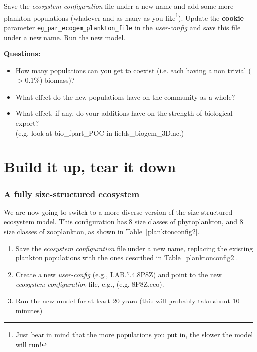 Save the \textit{ecosystem configuration} file under a new name and add some more plankton populations (whatever and as many as you like\footnote{Just bear in mind that the more populations you put in, the slower the model will run!}). Update the \textbf{cookie} parameter \texttt{eg\_par\_ecogem\_plankton\_file} in the \textit{user-config} and save this file under a new name.  Run the new model.

\vspace{2mm}
\noindent \textbf{Questions:}
\vspace{1mm}
\begin{itemize}
\item How many populations can you get to coexist (i.e. each having a non trivial ($>$0.1\%) biomass)?
\item What effect do the new populations have on the community as a whole?
\item What effect, if any, do your additions have on the strength of biological export?\\(e.g. look at \textsf{\footnotesize bio\_fpart\_POC} in \textsf{\footnotesize fields\_biogem\_3D.nc}.)
\end{itemize}
\vspace{2mm}

\newpage

\section{Build it up, tear it down}
\vspace{1mm}

\subsubsection{A fully size-structured  ecosystem}
\vspace{1mm}

We are now going to switch to a more diverse version of the size-structured ecosystem model. This configuration has 8 size classes of phytoplankton, and 8 size classes of zooplankton, as shown in Table~\ref{planktonconfig2}.

\begin{enumerate}[noitemsep]
\vspace{1mm}
\item Save the \textit{ecosystem configuration} file under a new name, replacing the existing plankton populations with the ones described in Table~\ref{planktonconfig2}.
\vspace{1mm}
\item Create a new \textit{user-config} (e.g., \textsf{\footnotesize LAB.7.4.8P8Z}) and point to the new \textit{ecosystem configuration} file, e.g., (e.g. \textsf{\footnotesize 8P8Z.eco}).
\vspace{1mm}
\item Run the new model for at least 20 years (this will probably take about 10 minutes).
\end{enumerate}

